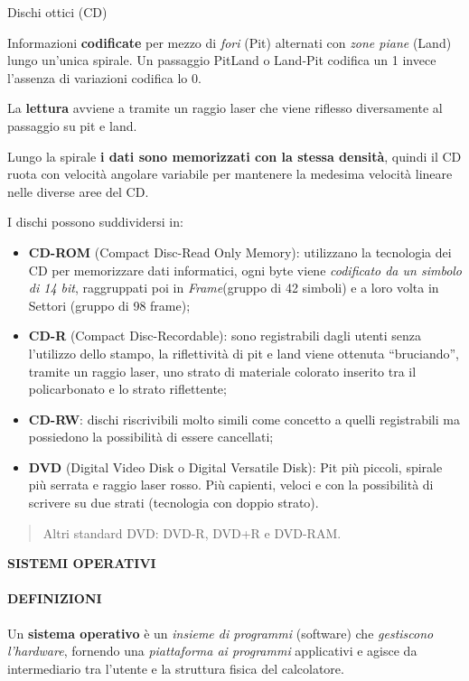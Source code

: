 Dischi ottici (CD)

Informazioni \textbf{codificate} per mezzo di \emph{fori} (Pit)
alternati con \emph{zone piane} (Land) lungo un'unica spirale. Un
passaggio PitLand o Land-Pit codifica un 1 invece l'assenza di
variazioni codifica lo 0.

La \textbf{lettura} avviene a tramite un raggio laser che viene riflesso
diversamente al passaggio su pit e land.

Lungo la spirale \textbf{i dati sono memorizzati con la stessa densità},
quindi il CD ruota con velocità angolare variabile per mantenere la
medesima velocità lineare nelle diverse aree del CD.

I dischi possono suddividersi in:

\begin{itemize}
\item
  \textbf{CD-ROM} (Compact Disc-Read Only Memory): utilizzano la
  tecnologia dei CD per memorizzare dati informatici, ogni byte viene
  \emph{codificato da un simbolo di 14 bit}, raggruppati poi in
  \emph{Frame}(gruppo di 42 simboli) e a loro volta in Settori (gruppo
  di 98 frame);
\item
  \textbf{CD-R} (Compact Disc-Recordable): sono registrabili dagli
  utenti senza l'utilizzo dello stampo, la riflettività di pit e land
  viene ottenuta ``bruciando'', tramite un raggio laser, uno strato di
  materiale colorato inserito tra il policarbonato e lo strato
  riflettente;
\item
  \textbf{CD-RW}: dischi riscrivibili molto simili come concetto a
  quelli registrabili ma possiedono la possibilità di essere cancellati;
\item
  \textbf{DVD} (Digital Video Disk o Digital Versatile Disk): Pit più
  piccoli, spirale più serrata e raggio laser rosso. Più capienti,
  veloci e con la possibilità di scrivere su due strati (tecnologia con
  doppio strato).
\end{itemize}

\begin{quote}
Altri standard DVD: DVD-R, DVD+R e DVD-RAM.
\end{quote}

\textbf{SISTEMI OPERATIVI}

\paragraph{DEFINIZIONI}\label{definizioni}

Un \textbf{sistema operativo} è un \emph{insieme di programmi}
(software) che \emph{gestiscono l'hardware}, fornendo una
\emph{piattaforma ai programmi} applicativi e agisce da intermediario
tra l'utente e la struttura fisica del calcolatore.

